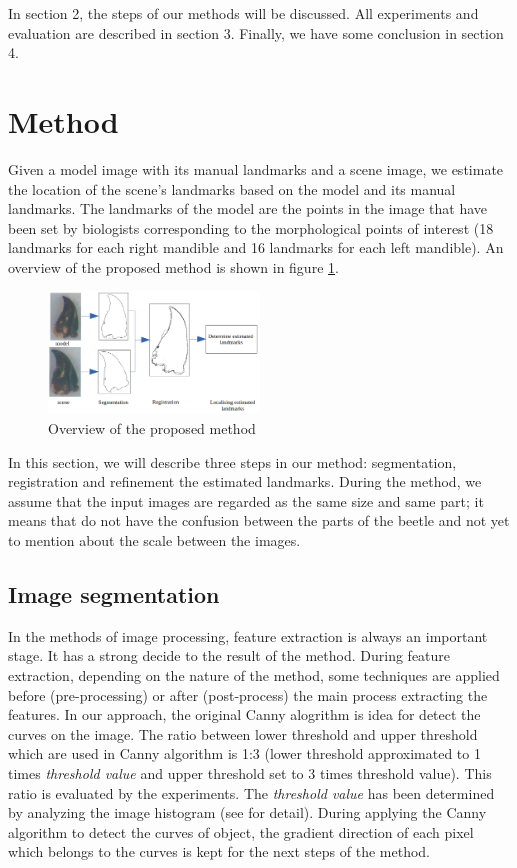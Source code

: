 \documentclass[twoside,twocolumn,10pt]{article}
\begin{document}
In section 2, the steps of our methods will be discussed. All
experiments and evaluation are described in section 3. Finally, we
have some conclusion in section 4.

\section{Method}
Given a model image with its manual landmarks and a scene image, we estimate the location of the scene's landmarks based on the model and its manual landmarks. The landmarks of the model are the points in the image that have been set by biologists corresponding to the morphological points of interest (18 landmarks for each right mandible and 16 landmarks for each left mandible). An overview of the proposed method is shown in figure \ref{fig:method}.

\begin{figure}[htb]
    \centering
    \includegraphics[width=0.5\textwidth]{./images/method}
    \caption{Overview of the proposed method}
    \label{fig:method}
\end{figure}
In this section, we will describe three steps in our method: segmentation, registration and refinement the estimated landmarks. During the method, we assume that the input images are regarded as the same size and same part; it means that do not have the confusion between the parts of the beetle and not yet to mention about the scale between the images. 

\subsection{Image segmentation}
In the methods of image processing, feature extraction is always an
important stage. It has a strong decide to the result of the method. During feature extraction, depending on the nature of the method, some techniques are applied before (pre-processing) or after (post-process) the main process extracting the features. In our approach, the original Canny
alogrithm\cite{canny1986computational} is idea for detect the curves on the image. The ratio between lower threshold and upper threshold which are used in Canny algorithm is 1:3 (lower threshold approximated to 1 times
\textit{threshold value} and upper threshold set to 3 times threshold
value). This ratio is evaluated by the experiments. The
\textit{threshold value} has been determined by analyzing the image
histogram (see \cite{leestimating} for detail). During applying the Canny algorithm to detect the curves of
object, the gradient direction of each pixel which belongs to the
curves is kept for the next steps of the method.
\end{document}
